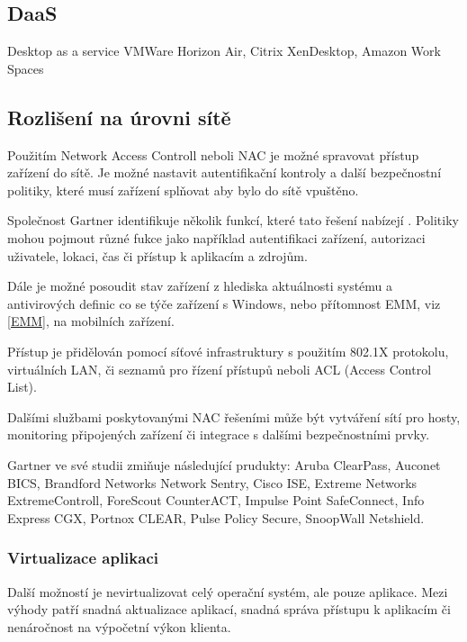  
 \subsection{DaaS}
 Desktop as a service
 VMWare Horizon Air, Citrix XenDesktop, Amazon Work Spaces
 
 
 \subsection{Rozlišení na úrovni sítě}
 Použitím Network Access Controll neboli NAC je možné spravovat přístup zařízení do sítě. Je možné nastavit autentifikační kontroly a další bezpečnostní politiky, které musí zařízení splňovat aby bylo do sítě vpuštěno. 
 
 Společnost Gartner identifikuje několik funkcí, které tato řešení nabízejí \cite{GartnerNAC}. %
 Politiky mohou pojmout různé fukce jako například autentifikaci zařízení, autorizaci uživatele, lokaci, čas či přístup k aplikacím a zdrojům.
 
 Dále je možné posoudit stav zařízení z hlediska aktuálnosti systému a antivirových definic co se týče zařízení s Windows, nebo přítomnost EMM, viz \ref{EMM},  na mobilních zařízení.
 
 Přístup je přidělován pomocí síťové infrastruktury s použitím 802.1X protokolu, virtuálních LAN, či seznamů pro řízení přístupů neboli ACL (Access Control List).
 
 Dalšími službami poskytovanými NAC řešeními může být vytváření sítí pro hosty, monitoring připojených zařízení či integrace s dalšími bezpečnostními prvky.
 
 
Gartner ve své studii zmiňuje následující prudukty: Aruba ClearPass, Auconet BICS, Brandford Networks Network Sentry, Cisco ISE, Extreme Networks ExtremeControll, ForeScout CounterACT, Impulse Point SafeConnect, Info Express CGX, Portnox CLEAR, Pulse Policy Secure, SnoopWall Netshield.
 
 
 \subsubsection{Virtualizace aplikaci}
 Další možností je nevirtualizovat celý operační systém, ale pouze aplikace. Mezi výhody patří snadná aktualizace aplikací, snadná správa přístupu k aplikacím či nenáročnost na výpočetní výkon klienta.
 
